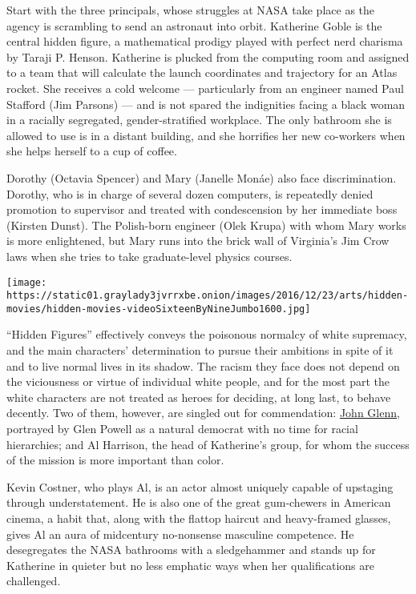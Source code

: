 Start with the three principals, whose struggles at NASA take place as
the agency is scrambling to send an astronaut into orbit. Katherine
Goble is the central hidden figure, a mathematical prodigy played with
perfect nerd charisma by Taraji P. Henson. Katherine is plucked from the
computing room and assigned to a team that will calculate the launch
coordinates and trajectory for an Atlas rocket. She receives a cold
welcome --- particularly from an engineer named Paul Stafford (Jim
Parsons) --- and is not spared the indignities facing a black woman in a
racially segregated, gender-stratified workplace. The only bathroom she
is allowed to use is in a distant building, and she horrifies her new
co-workers when she helps herself to a cup of coffee.

Dorothy (Octavia Spencer) and Mary (Janelle Monáe) also face
discrimination. Dorothy, who is in charge of several dozen computers, is
repeatedly denied promotion to supervisor and treated with condescension
by her immediate boss (Kirsten Dunst). The Polish-born engineer (Olek
Krupa) with whom Mary works is more enlightened, but Mary runs into the
brick wall of Virginia's Jim Crow laws when she tries to take
graduate-level physics courses.

\texttt{[image: https://static01.graylady3jvrrxbe.onion/images/2016/12/23/arts/hidden-movies/hidden-movies-videoSixteenByNineJumbo1600.jpg]}

``Hidden Figures'' effectively conveys the poisonous normalcy of white
supremacy, and the main characters' determination to pursue their
ambitions in spite of it and to live normal lives in its shadow. The
racism they face does not depend on the viciousness or virtue of
individual white people, and for the most part the white characters are
not treated as heroes for deciding, at long last, to behave decently.
Two of them, however, are singled out for commendation:
\href{http://www.nytimes3xbfgragh.onion/2016/12/08/us/john-glenn-dies.html}{John
Glenn}, portrayed by Glen Powell as a natural democrat with no time for
racial hierarchies; and Al Harrison, the head of Katherine's group, for
whom the success of the mission is more important than color.

Kevin Costner, who plays Al, is an actor almost uniquely capable of
upstaging through understatement. He is also one of the great
gum-chewers in American cinema, a habit that, along with the flattop
haircut and heavy-framed glasses, gives Al an aura of midcentury
no-nonsense masculine competence. He desegregates the NASA bathrooms
with a sledgehammer and stands up for Katherine in quieter but no less
emphatic ways when her qualifications are challenged.

